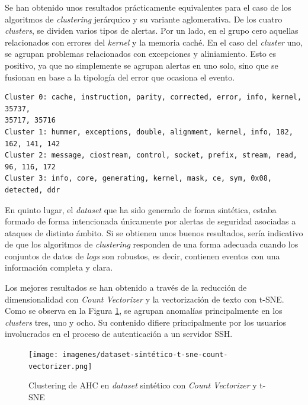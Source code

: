 Se han obtenido unos resultados prácticamente equivalentes para el caso de los algoritmos de \textit{clustering} jerárquico y su variante aglomerativa. De los cuatro \textit{clusters}, se dividen varios tipos de alertas. Por un lado, en el grupo cero aquellas relacionados con errores del \textit{kernel} y la memoria caché. En el caso del \textit{cluster} uno, se agrupan problemas relacionados con excepciones y aliniamiento. Esto es positivo, ya que no simplemente se agrupan alertas en uno solo, sino que se fusionan en base a la tipología del error que ocasiona el evento.


\begin{mdframed}
\scriptsize
\begin{verbatim}
Cluster 0: cache, instruction, parity, corrected, error, info, kernel, 35737, 
35717, 35716
Cluster 1: hummer, exceptions, double, alignment, kernel, info, 182, 162, 141, 142
Cluster 2: message, ciostream, control, socket, prefix, stream, read, 96, 116, 172
Cluster 3: info, core, generating, kernel, mask, ce, sym, 0x08, detected, ddr
\end{verbatim}
\end{mdframed}

En quinto lugar, el \textit{dataset} que ha sido generado de forma sintética, estaba formado de forma intencionada únicamente por alertas de seguridad asociadas a ataques de distinto ámbito. Si se obtienen unos buenos resultados, sería indicativo de que los algoritmos de \textit{clustering} responden de una forma adecuada cuando los conjuntos de datos de \textit{logs} son robustos, es decir, contienen eventos con una información completa y clara.

Los mejores resultados se han obtenido a través de la reducción de dimensionalidad con \textit{Count Vectorizer} y la vectorización de texto con \gls{t-SNE}. Como se observa en la Figura \ref{fig:dataset_05_count_vectorizer_t_sne}, se agrupan anomalías principalmente en los \textit{clusters} tres, uno y ocho. Su contenido difiere principalmente por los usuarios involucrados en el proceso de autenticación a un servidor \gls{SSH}. 

\begin{figure}[H]
    \centering
    \texttt{[image: imagenes/dataset-sintético-t-sne-count-vectorizer.png]}
    \caption{Clustering de \gls{AHC} en \textit{dataset} sintético con \textit{Count Vectorizer} y \gls{t-SNE}}
    \label{fig:dataset_05_count_vectorizer_t_sne}
\end{figure}

